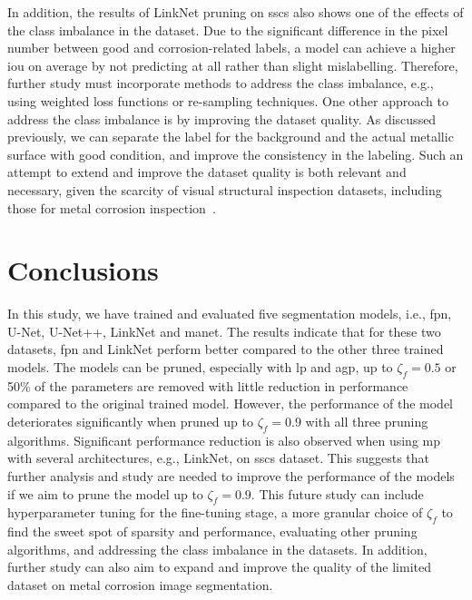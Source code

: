 \documentclass[mathematics,article,submit,pdftex,moreauthors]{Definitions/mdpi}
\begin{document}
In addition,
the results of LinkNet pruning on \ac{sscs}
also shows one of the effects of the class imbalance in
the dataset. Due to the significant difference in the pixel
number between good and corrosion-related labels, 
a model can achieve a higher \ac{iou} on average by not 
predicting at all rather than slight mislabelling. Therefore,
further study must incorporate methods to address the class imbalance,
e.g., using weighted loss functions or re-sampling techniques.
One other approach to address the class imbalance is by improving
the dataset quality. As discussed previously, we can separate
the label for the background and the actual metallic surface with
good condition, and improve the consistency in the labeling. 
Such an attempt to extend and improve the dataset quality is 
both relevant and necessary, given the scarcity
of visual structural inspection datasets, including
those for metal corrosion inspection~\cite{Bianchi2022}. 

\section{Conclusions}
In this study, we have trained and evaluated five 
segmentation models, i.e., \ac{fpn}, U-Net, U-Net++, 
LinkNet and \ac{manet}. The results indicate that for 
these two datasets, \ac{fpn} and LinkNet perform better compared to 
the other three trained models.
The models can be pruned, especially with \ac{lp}
and \ac{agp}, up to $\zeta_f=0.5$ or 50\% of 
the parameters are removed with
little reduction in performance compared to
the original trained model. However,
the performance of the model deteriorates significantly
when pruned up to $\zeta_f=0.9$ with all three pruning
algorithms. Significant performance reduction is also
observed when using \ac{mp} with several architectures,
e.g., LinkNet, on \ac{sscs} dataset.
This suggests that further analysis
and study are needed to improve the performance
of the models if we aim to prune the model up to $\zeta_f=0.9$.
This future study can include hyperparameter tuning
for the fine-tuning stage, a more granular choice
of $\zeta_f$ to find the sweet spot of sparsity
and performance, evaluating other pruning algorithms,
and addressing the class imbalance in the datasets.
In addition, further study can also aim to expand
and improve the quality of the limited dataset on 
metal corrosion image segmentation.


\end{document}
